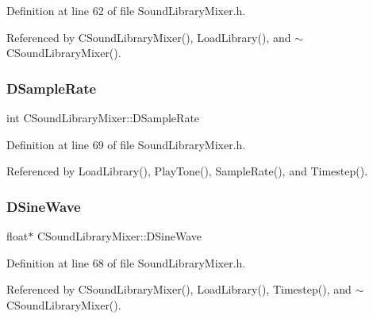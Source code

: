 Definition at line 62 of file Sound\+Library\+Mixer.\+h.



Referenced by C\+Sound\+Library\+Mixer(), Load\+Library(), and $\sim$\+C\+Sound\+Library\+Mixer().

\hypertarget{classCSoundLibraryMixer_af2d94eb0c2b55d92ff00d18a25cbed6a}{}\label{classCSoundLibraryMixer_af2d94eb0c2b55d92ff00d18a25cbed6a} 
\subsubsection{\texorpdfstring{D\+Sample\+Rate}{DSampleRate}}
{\footnotesize\ttfamily int C\+Sound\+Library\+Mixer\+::\+D\+Sample\+Rate\hspace{0.3cm}{\ttfamily [protected]}}



Definition at line 69 of file Sound\+Library\+Mixer.\+h.



Referenced by Load\+Library(), Play\+Tone(), Sample\+Rate(), and Timestep().

\hypertarget{classCSoundLibraryMixer_a7d696c93362c862bfc651a28ee8f67cf}{}\label{classCSoundLibraryMixer_a7d696c93362c862bfc651a28ee8f67cf} 
\subsubsection{\texorpdfstring{D\+Sine\+Wave}{DSineWave}}
{\footnotesize\ttfamily float$\ast$ C\+Sound\+Library\+Mixer\+::\+D\+Sine\+Wave\hspace{0.3cm}{\ttfamily [protected]}}



Definition at line 68 of file Sound\+Library\+Mixer.\+h.



Referenced by C\+Sound\+Library\+Mixer(), Load\+Library(), Timestep(), and $\sim$\+C\+Sound\+Library\+Mixer().

\hypertarget{classCSoundLibraryMixer_af4a006eacdcd590fad6e02cddaf197c2}{}\label{classCSoundLibraryMixer_af4a006eacdcd590fad6e02cddaf197c2} 
